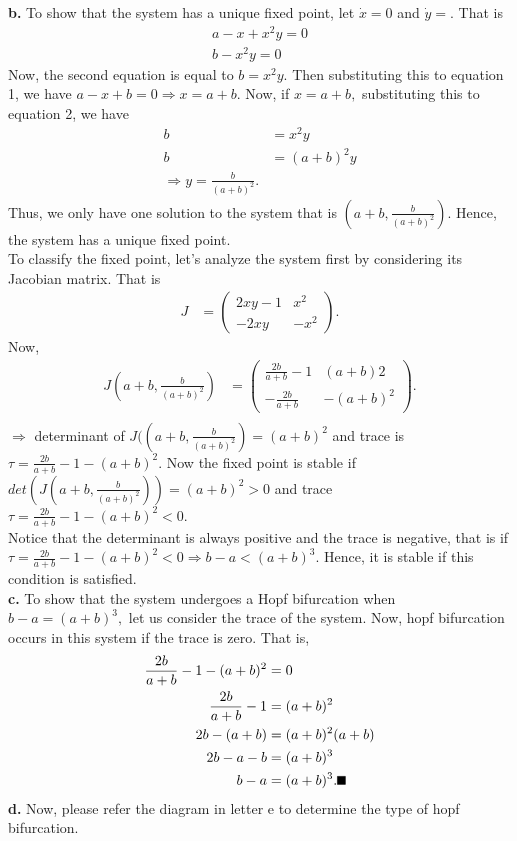 \documentclass[12pt]{article}
\newcommand{\mycbox}[1]{\tikz{\path[draw=#1,fill=#1] (0,0) rectangle (.2cm,.2cm);}}
\begin{document}
	\indent
	{\bf b. } To show that the system has a unique fixed point, let $\dot{x}=0$ and $\dot{y}=.$ That is\\
	\begin{align}
	a-x+x^2y=0\\
	b-x^2y=0
	\end{align}
	Now, the second equation is equal to $b=x^2y$. Then substituting this to equation 1, we have $a-x+b=0 \Rightarrow x=a+b.$ Now, if $x=a+b,$ substituting this to equation 2, we have
	\begin{align*}
	b&=x^2y\\
	b&=(a+b)^2y\\
	\Rightarrow y=\frac{b}{(a+b)^2}.
	\end{align*}
	Thus, we only have one solution to the system that is $\left(a+b,\frac{b}{(a+b)^2}\right).$ Hence, the system has a unique fixed point.\mycbox{black}\\
	To classify the fixed point, let's analyze the system first by considering its Jacobian matrix. That is 
	\begin{align*}
	J&=\left(\begin{array}{cc} 2xy-1 & x^2 \\
	-2xy & -x^2
	\end{array}\right).
	\end{align*}
	Now, 
	\begin{align*}
	J\left(a+b,\frac{b}{(a+b)^2}\right)&=\left(\begin{array}{cc} \frac{2b}{a+b}-1 & (a+b)2 \\
	-\frac{2b}{a+b} & -(a+b)^2
	\end{array}\right).\\ 
	\end{align*}
	$\Rightarrow$ determinant of $J(\left(a+b,\frac{b}{(a+b)^2}\right)=(a+b)^2$ and trace is $\tau=\frac{2b}{a+b}-1-(a+b)^2.$ Now the fixed point is stable if $det\left(J\left(a+b,\frac{b}{(a+b)^2}\right)\right)=(a+b)^2>0$ and trace $\tau=\frac{2b}{a+b}-1-(a+b)^2<0$.\\
	Notice that the determinant is always positive and the trace is negative, that is if $\tau=\frac{2b}{a+b}-1-(a+b)^2<0\Rightarrow b-a<(a+b)^3.$ Hence, it is stable if this condition is satisfied.\\
	\indent
	{\bf c. } To show that the system undergoes a Hopf bifurcation when $b-a=(a+b)^3,$ let us consider the trace of the system. Now, hopf bifurcation occurs in this system if the trace is zero. That is,
	\begin{align*}
	\frac{2b}{a+b}-1-(a+b)^2&=0\\
	\frac{2b}{a+b}-1&=(a+b)^2\\
	2b-(a+b)&=(a+b)^2(a+b)\\
	2b-a-b&=(a+b)^3\\
	b-a&=(a+b)^3. \mycbox{black}
	\end{align*}
	\indent
	{\bf d. } Now, please refer the diagram in letter e to determine the type of hopf bifurcation.\\
	
\end{document}
